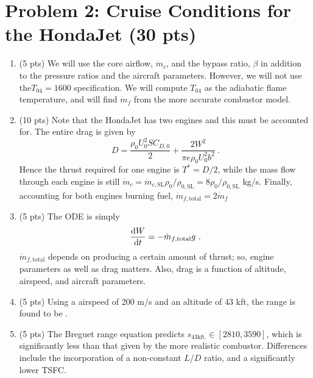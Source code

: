\documentclass[12pt]{article}
\begin{document}
\section{Problem 2: Cruise Conditions for the HondaJet (30 pts)}
	\begin{enumerate}[label=(\alph*)]
		\item (5 pts)
			We will use the core airflow, $\dot{m}_c$, and the bypass ratio, $\beta$ in addition to the pressure ratios and the aircraft parameters. However, we will not use  the$T_{04}=1600$ specification. We will compute $T_{04}$ as the adiabatic flame temperature, and will find $\dot{m}_f$ from the more accurate combustor model.
		\item (10 pts)
			Note that the HondaJet has two engines and this must be accounted for. The entire drag is given by
			\begin{equation}
				D=\frac{\rho_0 U_0^2SC_{D,0}}{2}+\frac{2W^2}{\pi e \rho_0 U_0^2 b^2}\ .
			\end{equation}
			Hence the thrust required for one engine is $T^*=D/2$, while the mass flow through each engine is still $\dot{m}_c=\dot{m}_{c,\mathrm{SL}}\rho_0/\rho_{0,\mathrm{SL}}=8\rho_0/\rho_{0,\mathrm{SL}}$ kg/s. Finally, accounting for both engines burning fuel, $\dot{m}_{f,\mathrm{total}}=2\dot{m}_f$
		\item (5 pts)
			The ODE is simply 
			\begin{equation}
				\frac{\textup d W }{\textup d t}=-\dot{m}_{f,\mathrm{total}}g\ .
			\end{equation}
			$\dot{m}_{f,\mathrm{total}}$ depends on producing a certain amount of thrust; so, engine parameters as well as drag matters. Also, drag is a function of altitude, airspeed, and aircraft parameters.
		\item (5 pts)
			Using a airspeed of 200 m/s and an altitude of 43 kft, the range is found to be .
		\item (5 pts)
			The Breguet range equation predicts $s_{43\mathrm{kft.}}\in[2810,3590]$, which is significantly less than that given by the more realistic combustor. Differences include the incorporation of a non-constant $L/D$ ratio, and a significantly lower TSFC.
	\end{enumerate}
\end{document}
